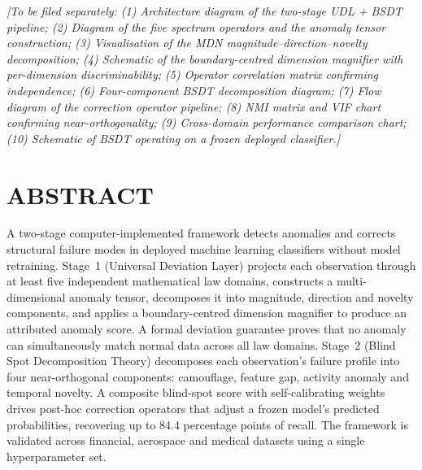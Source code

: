 \documentclass[12pt,a4paper]{article}
\begin{document}
\textit{[To be filed separately:
(1) Architecture diagram of the two-stage UDL + BSDT pipeline;
(2) Diagram of the five spectrum operators and the anomaly tensor
construction;
(3) Visualisation of the MDN magnitude--direction--novelty decomposition;
(4) Schematic of the boundary-centred dimension magnifier with per-dimension
discriminability;
(5) Operator correlation matrix confirming independence;
(6) Four-component BSDT decomposition diagram;
(7) Flow diagram of the correction operator pipeline;
(8) NMI matrix and VIF chart confirming near-orthogonality;
(9) Cross-domain performance comparison chart;
(10) Schematic of BSDT operating on a frozen deployed classifier.]}

\newpage
\section*{ABSTRACT}

A two-stage computer-implemented framework detects anomalies and corrects
structural failure modes in deployed machine learning classifiers without
model retraining. Stage~1 (Universal Deviation Layer) projects each
observation through at least five independent mathematical law domains,
constructs a multi-dimensional anomaly tensor, decomposes it into magnitude,
direction and novelty components, and applies a boundary-centred dimension
magnifier to produce an attributed anomaly score. A formal deviation
guarantee proves that no anomaly can simultaneously match normal data across
all law domains. Stage~2 (Blind Spot Decomposition Theory) decomposes each
observation's failure profile into four near-orthogonal components:
camouflage, feature gap, activity anomaly and temporal novelty. A composite
blind-spot score with self-calibrating weights drives post-hoc correction
operators that adjust a frozen model's predicted probabilities, recovering
up to 84.4 percentage points of recall. The framework is validated across
financial, aerospace and medical datasets using a single hyperparameter set.
\end{document}
